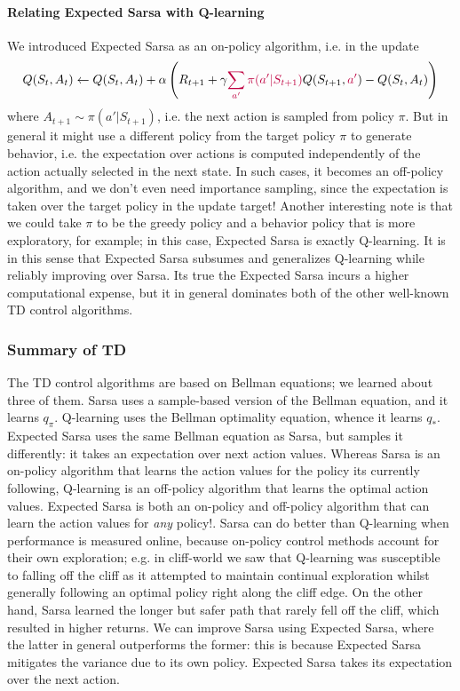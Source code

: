 \documentclass[12pt]{article}
\begin{document}
\paragraph{Relating Expected Sarsa with Q-learning} We introduced Expected Sarsa as an on-policy algorithm, i.e. in the update
\[
  Q(S_t, A_t) \gets Q(S_t, A_t) + \alpha \left(R_{t+1} + \gamma {\color{purple} \sum_{a'} \pi(a'|S_{t+1})} Q(S_{t+1}, {\color{purple}a'}) - Q(S_t, A_t)\right)
\]
where $A_{t+1} \sim \pi(a' | S_{t+1})$, i.e. the next action is sampled from policy $\pi$. But in general it might use a different policy from the target policy $\pi$ to generate behavior, i.e. the expectation over actions is computed independently of the action actually selected in the next state. In such cases, it becomes an off-policy algorithm, and we don't even need importance sampling, since the expectation is taken over the target policy in the update target! Another interesting note is that we could take $\pi$ to be the greedy policy and a behavior policy that is more exploratory, for example; in this case, Expected Sarsa is exactly Q-learning. It is in this sense that Expected Sarsa subsumes and generalizes Q-learning while reliably improving over Sarsa. Its true the Expected Sarsa incurs a higher computational expense, but it in general dominates both of the other well-known TD control algorithms.

\subsubsection{Summary of TD}
The TD control algorithms are based on Bellman equations; we learned about three of them. Sarsa uses a sample-based version of the Bellman equation, and it learns $q_\pi$. Q-learning uses the Bellman optimality equation, whence it learns $q_*$. Expected Sarsa uses the same Bellman equation as Sarsa, but samples it differently: it takes an expectation over next action values. Whereas Sarsa is an on-policy algorithm that learns the action values for the policy its currently following, Q-learning is an off-policy algorithm that learns the optimal action values. Expected Sarsa is both an on-policy and off-policy algorithm that can learn the action values for \emph{any} policy!. Sarsa can do better than Q-learning when performance is measured online, because on-policy control methods account for their own exploration; e.g. in cliff-world we saw that Q-learning was susceptible to falling off the cliff as it attempted to maintain continual exploration whilst generally following an optimal policy right along the cliff edge. On the other hand, Sarsa learned the longer but safer path that rarely fell off the cliff, which resulted in higher returns. We can improve Sarsa using Expected Sarsa, where the latter in general outperforms the former: this is because Expected Sarsa mitigates the variance due to its own policy. Expected Sarsa takes its expectation over the next action.
\end{document}
